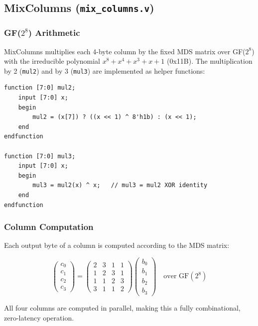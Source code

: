 \documentclass[12pt,a4paper]{article}
\begin{document}
\subsection{MixColumns (\texttt{mix\_columns.v})}

\subsubsection{GF($2^8$) Arithmetic}

MixColumns multiplies each 4-byte column by the fixed MDS matrix over
GF($2^8$) with the irreducible polynomial $x^8 + x^4 + x^3 + x + 1$
(0x11B). The multiplication by 2 (\texttt{mul2}) and by 3 (\texttt{mul3})
are implemented as helper functions:

\begin{lstlisting}[caption={GF(2\^{}8) multiplication helper functions}]
function [7:0] mul2;
    input [7:0] x;
    begin
        mul2 = (x[7]) ? ((x << 1) ^ 8'h1b) : (x << 1);
    end
endfunction

function [7:0] mul3;
    input [7:0] x;
    begin
        mul3 = mul2(x) ^ x;   // mul3 = mul2 XOR identity
    end
endfunction
\end{lstlisting}

\subsubsection{Column Computation}

Each output byte of a column is computed according to the MDS matrix:

\[
\begin{pmatrix} c_0 \\ c_1 \\ c_2 \\ c_3 \end{pmatrix}
=
\begin{pmatrix} 2 & 3 & 1 & 1 \\ 1 & 2 & 3 & 1 \\
                1 & 1 & 2 & 3 \\ 3 & 1 & 1 & 2 \end{pmatrix}
\begin{pmatrix} b_0 \\ b_1 \\ b_2 \\ b_3 \end{pmatrix}
\quad \text{over GF}(2^8)
\]

All four columns are computed in parallel, making this a fully
combinational, zero-latency operation.
\end{document}
